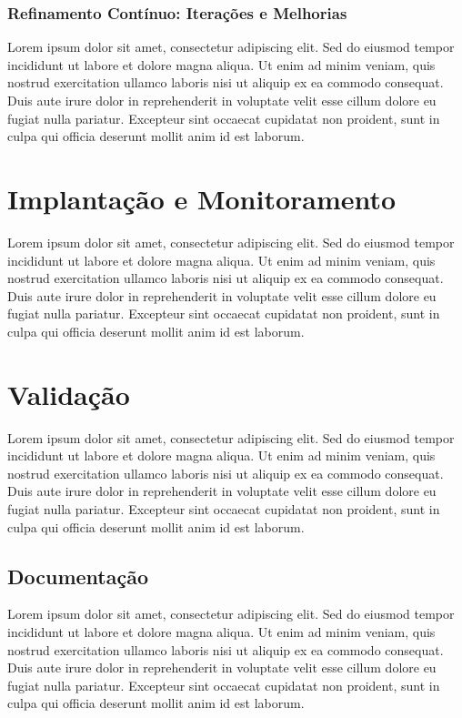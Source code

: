 \documentclass[
	12pt,				    %
	openright,			    %
	oneside,			    %
	a4paper,			    %
    sumario=tradicional,    %
	english,			    %
	brazilian,				    %
	]{abntex2}
\begin{document}
\subsubsection{Refinamento Contínuo: Iterações e Melhorias}

Lorem ipsum dolor sit amet, consectetur adipiscing elit. Sed do eiusmod tempor incididunt ut labore et dolore magna aliqua. Ut enim ad minim veniam, quis nostrud exercitation ullamco laboris nisi ut aliquip ex ea commodo consequat. Duis aute irure dolor in reprehenderit in voluptate velit esse cillum dolore eu fugiat nulla pariatur. Excepteur sint occaecat cupidatat non proident, sunt in culpa qui officia deserunt mollit anim id est laborum.

\section{Implantação e Monitoramento}

Lorem ipsum dolor sit amet, consectetur adipiscing elit. Sed do eiusmod tempor incididunt ut labore et dolore magna aliqua. Ut enim ad minim veniam, quis nostrud exercitation ullamco laboris nisi ut aliquip ex ea commodo consequat. Duis aute irure dolor in reprehenderit in voluptate velit esse cillum dolore eu fugiat nulla pariatur. Excepteur sint occaecat cupidatat non proident, sunt in culpa qui officia deserunt mollit anim id est laborum.

\section{Validação}

Lorem ipsum dolor sit amet, consectetur adipiscing elit. Sed do eiusmod tempor incididunt ut labore et dolore magna aliqua. Ut enim ad minim veniam, quis nostrud exercitation ullamco laboris nisi ut aliquip ex ea commodo consequat. Duis aute irure dolor in reprehenderit in voluptate velit esse cillum dolore eu fugiat nulla pariatur. Excepteur sint occaecat cupidatat non proident, sunt in culpa qui officia deserunt mollit anim id est laborum.

\subsection{Documentação}

Lorem ipsum dolor sit amet, consectetur adipiscing elit. Sed do eiusmod tempor incididunt ut labore et dolore magna aliqua. Ut enim ad minim veniam, quis nostrud exercitation ullamco laboris nisi ut aliquip ex ea commodo consequat. Duis aute irure dolor in reprehenderit in voluptate velit esse cillum dolore eu fugiat nulla pariatur. Excepteur sint occaecat cupidatat non proident, sunt in culpa qui officia deserunt mollit anim id est laborum.
\end{document}
